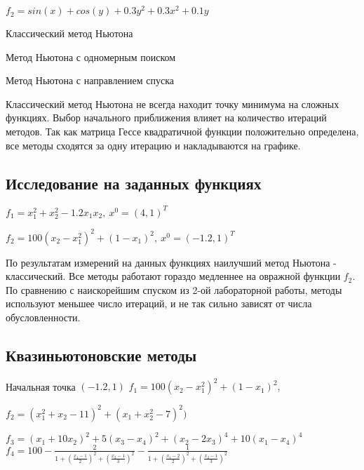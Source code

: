 \(f_2 = sin(x) + cos(y) + 0.3y^2+ 0.3x^2 + 0.1y\)

Классический метод Ньютона\\

Метод Ньютона с одномерным поиском\\

Метод Ньютона с направлением спуска\\


Классический метод Ньютона не всегда находит точку минимума на сложных функциях.
Выбор начального приближения влияет на количество итераций методов.
Так как матрица Гессе квадратичной функции положительно определена, все методы сходятся за одну итерацию и накладываются на графике.

\subsection{Исследование на заданных функциях}
\(f_1 = x_1^2 + x_2^2 - 1.2x_1x_2,\ x^0 = (4, 1)^T\) \\

\(f_2 = 100(x_2 - x_1^2)^2 + (1 - x_1)^2,\ x^0 = (-1.2, 1)^T\)	


По результатам измерений на данных функциях наилучший метод Ньютона - классический. Все методы работают гораздо медленнее на овражной функции $f_2$. По сравнению с наискорейшим спуском из 2-ой лабораторной работы, методы используют меньшее число итераций, и не так сильно зависят от числа обусловленности.

\subsection{Квазиньютоновские методы}
Начальная точка $(-1.2, 1)$
\(f_1 = 100(x_2 - x_1^2)^2 + (1 - x_1)^2,\)\\

\(f_2 = (x_1^2 + x_2 - 11)^2 + (x_1 + x_2^2 - 7)^2)\)\\

\(f_3 = (x_1 + 10x_2)^2 + 5(x_3 - x_4)^2 + (x_2 - 2x_3)^4 + 10(x_1 - x_4)^4\)\\

\(f_4 = 100 - \frac{2}{1 + (\frac{x_1 - 1}{2})^2 + (\frac{x_2 - 1}{3})^2} - \frac{1}{1 + (\frac{x_1 - 2}{2})^2 + (\frac{x_2 - 1}{3})^2}\)\\

